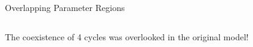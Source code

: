 \begin{frame}{Overlapping Parameter Regions}
\begin{columns}
\begin{column}{.5 \textwidth}
			\vspace{.5em}
			The coexistence of 4 cycles was overlooked in the original model!
		\end{column}
		\begin{column}{.5 \textwidth}
			\vspace{-5em}
			\begin{figure}
				\centering
\end{figure}
\end{column}
\end{columns}
\end{frame}
